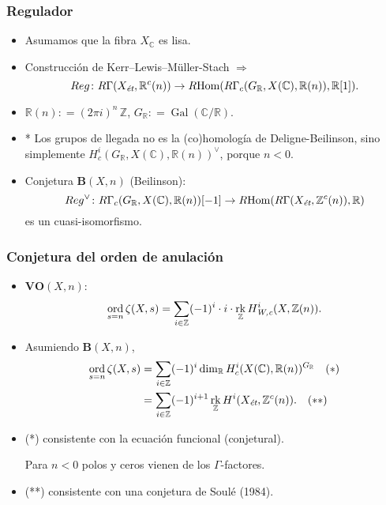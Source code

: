 \documentclass[handout]{beamer}
\newcommand{\CC}{\mathbb{C}}
\newcommand{\RR}{\mathbb{R}}
\newcommand{\ZZ}{\mathbb{Z}}
\DeclareMathOperator{\Gal}{Gal}
\newcommand{\dfn}{\mathrel{\mathop:}=}
\DeclareMathOperator{\Hom}{Hom}
\DeclareMathOperator{\ord}{ord}
\DeclareMathOperator{\rk}{rk}
\newcommand{\et}{\text{\it ét}}
\newcommand{\Wc}{\text{\it W,c}}
\newcommand{\RHom}{R\!\Hom}
\begin{document}

\begin{frame}
  \frametitle{Regulador}

  \begin{itemize}
  \item Asumamos que la fibra $X_\CC$ es lisa.

  \item Construcción de Kerr--Lewis--Müller-Stach $\Longrightarrow$
    \[ Reg\colon R\Gamma (X_\et, \RR^c (n)) \to
      \RHom (R\Gamma_c (G_\RR, X(\CC), \RR (n)), \RR[1]). \]

  \item $\RR(n) \dfn (2\pi i)^n\,\ZZ$, $G_\RR \dfn \Gal (\CC/\RR)$.

  \item * Los grupos de llegada no es la (co)homología de Deligne-Beilinson,
    sino simplemente $H_c^i (G_\RR, X(\CC), \RR (n))^\vee$, porque $n < 0$.

  \item Conjetura $\mathbf{B} (X,n)$ (Beilinson):
    \[ Reg^\vee\colon R\Gamma_c (G_\RR, X (\CC), \RR (n)) [-1] \to
      \RHom (R\Gamma (X_\et, \ZZ^c (n)), \RR) \]
    es un cuasi-isomorfismo.
  \end{itemize}
\end{frame}


\begin{frame}
  \frametitle{Conjetura del orden de anulación}

  \begin{itemize}
  \item $\mathbf{VO} (X,n)$:
    \[ \ord_{s=n} \zeta (X,s) =
      \sum_{i \in \ZZ} (-1)^i \cdot i \cdot \rk_\ZZ H^i_\Wc (X, \ZZ (n)). \]

  \item Asumiendo $\mathbf{B} (X,n)$,
    \begin{align*}
      \ord_{s=n} \zeta (X,s) & = \sum_{i \in \ZZ} (-1)^i \dim_\RR H^i_c (X(\CC), \RR (n))^{G_\RR} \quad (*) \\
                             & = \sum_{i \in \ZZ} (-1)^{i+1} \rk_\ZZ H^i (X_\et, \ZZ^c (n)). \quad (**)
    \end{align*}

  \item (*) consistente con la ecuación funcional (conjetural).

    Para $n < 0$ polos y ceros vienen de los $\Gamma$-factores.

  \item (**) consistente con una conjetura de Soulé (1984).
  \end{itemize}
\end{frame}
\end{document}
